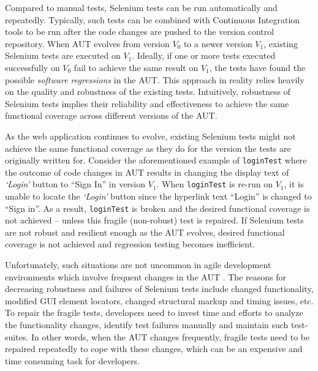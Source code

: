 Compared to manual tests, Selenium tests can be run automatically and repeatedly. Typically, such tests can be combined with Continuous Integration tools to be run after the code changes are pushed to the version control repository. When AUT evolves from version $V_{0}$ to a newer version $V_{1}$, existing Selenium tests are executed on $V_{1}$. Ideally, if one or more tests executed successfully on $V_{0}$ fail to achieve the same result on $V_{1}$, the tests have found the possible \textit{software regressions} in the AUT. This approach in reality relies heavily on the quality and robustness of the existing tests. Intuitively, robustness of Selenium tests implies their reliability and effectiveness to achieve the same functional coverage across different versions of the AUT. 


As the web application continues to evolve, existing Selenium tests might not achieve the same functional coverage as they do for the version the tests are originally written for. Consider the aforementioned example of \texttt{loginTest} where the outcome of code changes in AUT results in changing the display text of \textit{`Login'} button to ``Sign In'' in version $V_{1}$. When \texttt{loginTest} is re-run on $V_{1}$, it is unable to locate the \textit{`Login'} button since the hyperlink text ``Login'' is changed to ``Sign in''. As a result, \texttt{loginTest} is broken and the desired functional coverage is not achieved -- unless this fragile (non-robust) test is repaired. If Selenium tests are not robust and resilient enough as the AUT evolves, desired functional coverage is not achieved and regression testing becomes inefficient.


Unfortunately, such situations are not uncommon in agile development environments which involve frequent changes in the AUT \cite{martin2003agile}. The reasons for decreasing robustness and failures of Selenium tests include changed functionality, modified GUI element locators, changed structural markup and timing issues, etc. To repair the fragile tests, developers need to invest time and efforts to analyze the functionality changes, identify test failures manually and maintain such test-suites. In other words, when the AUT changes frequently, fragile tests need to be repaired repeatedly to cope with these changes, which can be an expensive and time consuming task for developers. 

